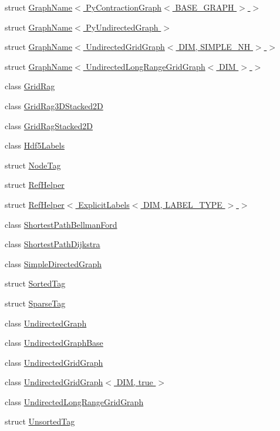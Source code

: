 \begin{DoxyCompactItemize}
\item 
struct \hyperlink{structnifty_1_1graph_1_1GraphName_3_01PyContractionGraph_3_01BASE__GRAPH_01_4_01_4}{Graph\+Name$<$ Py\+Contraction\+Graph$<$ B\+A\+S\+E\+\_\+\+G\+R\+A\+P\+H $>$ $>$}
\item 
struct \hyperlink{structnifty_1_1graph_1_1GraphName_3_01PyUndirectedGraph_01_4}{Graph\+Name$<$ Py\+Undirected\+Graph $>$}
\item 
struct \hyperlink{structnifty_1_1graph_1_1GraphName_3_01UndirectedGridGraph_3_01DIM_00_01SIMPLE__NH_01_4_01_4}{Graph\+Name$<$ Undirected\+Grid\+Graph$<$ D\+I\+M, S\+I\+M\+P\+L\+E\+\_\+\+N\+H $>$ $>$}
\item 
struct \hyperlink{structnifty_1_1graph_1_1GraphName_3_01UndirectedLongRangeGridGraph_3_01DIM_01_4_01_4}{Graph\+Name$<$ Undirected\+Long\+Range\+Grid\+Graph$<$ D\+I\+M $>$ $>$}
\item 
class \hyperlink{classnifty_1_1graph_1_1GridRag}{Grid\+Rag}
\item 
class \hyperlink{classnifty_1_1graph_1_1GridRag3DStacked2D}{Grid\+Rag3\+D\+Stacked2D}
\item 
class \hyperlink{classnifty_1_1graph_1_1GridRagStacked2D}{Grid\+Rag\+Stacked2D}
\item 
class \hyperlink{classnifty_1_1graph_1_1Hdf5Labels}{Hdf5\+Labels}
\item 
struct \hyperlink{structnifty_1_1graph_1_1NodeTag}{Node\+Tag}
\item 
struct \hyperlink{structnifty_1_1graph_1_1RefHelper}{Ref\+Helper}
\item 
struct \hyperlink{structnifty_1_1graph_1_1RefHelper_3_01ExplicitLabels_3_01DIM_00_01LABEL__TYPE_01_4_01_4}{Ref\+Helper$<$ Explicit\+Labels$<$ D\+I\+M, L\+A\+B\+E\+L\+\_\+\+T\+Y\+P\+E $>$ $>$}
\item 
class \hyperlink{classnifty_1_1graph_1_1ShortestPathBellmanFord}{Shortest\+Path\+Bellman\+Ford}
\item 
class \hyperlink{classnifty_1_1graph_1_1ShortestPathDijkstra}{Shortest\+Path\+Dijkstra}
\item 
class \hyperlink{classnifty_1_1graph_1_1SimpleDirectedGraph}{Simple\+Directed\+Graph}
\item 
struct \hyperlink{structnifty_1_1graph_1_1SortedTag}{Sorted\+Tag}
\item 
struct \hyperlink{structnifty_1_1graph_1_1SparseTag}{Sparse\+Tag}
\item 
class \hyperlink{classnifty_1_1graph_1_1UndirectedGraph}{Undirected\+Graph}
\item 
class \hyperlink{classnifty_1_1graph_1_1UndirectedGraphBase}{Undirected\+Graph\+Base}
\item 
class \hyperlink{classnifty_1_1graph_1_1UndirectedGridGraph}{Undirected\+Grid\+Graph}
\item 
class \hyperlink{classnifty_1_1graph_1_1UndirectedGridGraph_3_01DIM_00_01true_01_4}{Undirected\+Grid\+Graph$<$ D\+I\+M, true $>$}
\item 
class \hyperlink{classnifty_1_1graph_1_1UndirectedLongRangeGridGraph}{Undirected\+Long\+Range\+Grid\+Graph}
\item 
struct \hyperlink{structnifty_1_1graph_1_1UnsortedTag}{Unsorted\+Tag}
\end{DoxyCompactItemize}
